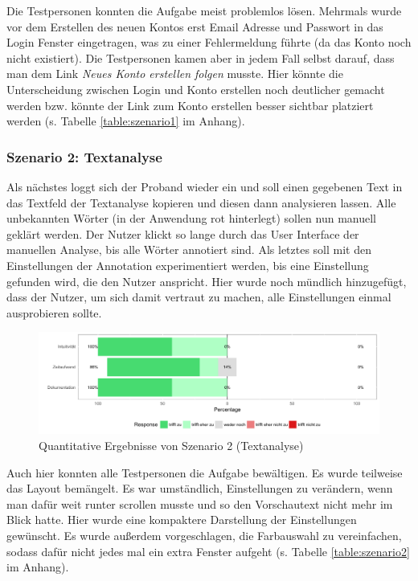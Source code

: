 Die Testpersonen konnten die Aufgabe meist problemlos lösen. Mehrmals wurde vor dem Erstellen des neuen Kontos erst Email Adresse und Passwort in das Login Fenster eingetragen, was zu einer Fehlermeldung führte (da das Konto noch nicht existiert). Die Testpersonen kamen aber in jedem Fall selbst darauf, dass man dem Link \textit{Neues Konto erstellen folgen} musste. Hier könnte die Unterscheidung zwischen Login und Konto erstellen noch deutlicher gemacht werden bzw. könnte der Link zum Konto erstellen besser sichtbar platziert werden (s. Tabelle \ref{table:szenario1} im Anhang).

\subsubsection{Szenario 2: Textanalyse}

Als nächstes loggt sich der Proband wieder ein und soll einen gegebenen Text in das Textfeld der Textanalyse kopieren und diesen dann analysieren lassen. Alle unbekannten Wörter (in der Anwendung rot hinterlegt) sollen nun manuell geklärt werden. Der Nutzer klickt so lange durch das User Interface der manuellen Analyse, bis alle Wörter annotiert sind. Als letztes soll mit den Einstellungen der Annotation experimentiert werden, bis eine Einstellung gefunden wird, die den Nutzer anspricht. Hier wurde noch mündlich hinzugefügt, dass der Nutzer, um sich damit vertraut zu machen, alle Einstellungen einmal ausprobieren sollte.

\begin{figure}[h!]
	\centering
	\includegraphics[width=.8\linewidth]{figures/evaluation/scenario2}
	\caption{Quantitative Ergebnisse von Szenario 2 (Textanalyse)}
	\label{fig:evaluation-sc2}
\end{figure}

Auch hier konnten alle Testpersonen die Aufgabe bewältigen. Es wurde teilweise das Layout bemängelt. Es war umständlich, Einstellungen zu verändern, wenn man dafür weit runter scrollen musste und so den Vorschautext nicht mehr im Blick hatte. Hier wurde eine kompaktere Darstellung der Einstellungen gewünscht. Es wurde außerdem vorgeschlagen, die Farbauswahl zu vereinfachen, sodass dafür nicht jedes mal ein extra Fenster aufgeht (s. Tabelle \ref{table:szenario2} im Anhang).

